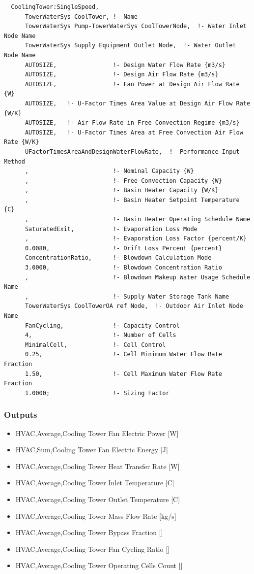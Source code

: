\begin{lstlisting}
  CoolingTower:SingleSpeed,
      TowerWaterSys CoolTower, !- Name
      TowerWaterSys Pump-TowerWaterSys CoolTowerNode,  !- Water Inlet Node Name
      TowerWaterSys Supply Equipment Outlet Node,  !- Water Outlet Node Name
      AUTOSIZE,                !- Design Water Flow Rate {m3/s}
      AUTOSIZE,                !- Design Air Flow Rate {m3/s}
      AUTOSIZE,                !- Fan Power at Design Air Flow Rate {W}
      AUTOSIZE,   !- U-Factor Times Area Value at Design Air Flow Rate {W/K}
      AUTOSIZE,   !- Air Flow Rate in Free Convection Regime {m3/s}
      AUTOSIZE,   !- U-Factor Times Area at Free Convection Air Flow Rate {W/K}
      UFactorTimesAreaAndDesignWaterFlowRate,  !- Performance Input Method
      ,                        !- Nominal Capacity {W}
      ,                        !- Free Convection Capacity {W}
      ,                        !- Basin Heater Capacity {W/K}
      ,                        !- Basin Heater Setpoint Temperature {C}
      ,                        !- Basin Heater Operating Schedule Name
      SaturatedExit,           !- Evaporation Loss Mode
      ,                        !- Evaporation Loss Factor {percent/K}
      0.0080,                  !- Drift Loss Percent {percent}
      ConcentrationRatio,      !- Blowdown Calculation Mode
      3.0000,                  !- Blowdown Concentration Ratio
      ,                        !- Blowdown Makeup Water Usage Schedule Name
      ,                        !- Supply Water Storage Tank Name
      TowerWaterSys CoolTowerOA ref Node,  !- Outdoor Air Inlet Node Name
      FanCycling,              !- Capacity Control
      4,                       !- Number of Cells
      MinimalCell,             !- Cell Control
      0.25,                    !- Cell Minimum Water Flow Rate Fraction
      1.50,                    !- Cell Maximum Water Flow Rate Fraction
      1.0000;                  !- Sizing Factor
\end{lstlisting}

\subsubsection{Outputs}\label{outputs-004}

\begin{itemize}
\item
  HVAC,Average,Cooling Tower Fan Electric Power {[}W{]}
\item
  HVAC,Sum,Cooling Tower Fan Electric Energy {[}J{]}
\item
  HVAC,Average,Cooling Tower Heat Transfer Rate {[}W{]}
\item
  HVAC,Average,Cooling Tower Inlet Temperature {[}C{]}
\item
  HVAC,Average,Cooling Tower Outlet Temperature {[}C{]}
\item
  HVAC,Average,Cooling Tower Mass Flow Rate {[}kg/s{]}
\item
  HVAC,Average,Cooling Tower Bypass Fraction {[]}
\item
  HVAC,Average,Cooling Tower Fan Cycling Ratio {[]}
\item
  HVAC,Average,Cooling Tower Operating Cells Count {[]}
\end{itemize}

